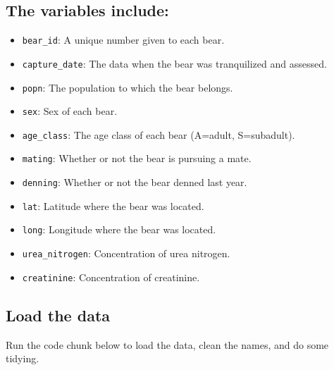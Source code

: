 \documentclass[
]{article}
\providecommand{\tightlist}{%
  \setlength{\itemsep}{0pt}\setlength{\parskip}{0pt}}
\begin{document}
\subsection{The variables include:}\label{the-variables-include}

\begin{itemize}
\tightlist
\item
  \texttt{bear\_id}: A unique number given to each bear.\\
\item
  \texttt{capture\_date}: The data when the bear was tranquilized and
  assessed.\\
\item
  \texttt{popn}: The population to which the bear belongs.\\
\item
  \texttt{sex}: Sex of each bear.\\
\item
  \texttt{age\_class}: The age class of each bear (A=adult,
  S=subadult).\\
\item
  \texttt{mating}: Whether or not the bear is pursuing a mate.\\
\item
  \texttt{denning}: Whether or not the bear denned last year.\\
\item
  \texttt{lat}: Latitude where the bear was located.\\
\item
  \texttt{long}: Longitude where the bear was located.\\
\item
  \texttt{urea\_nitrogen}: Concentration of urea nitrogen.\\
\item
  \texttt{creatinine}: Concentration of creatinine.
\end{itemize}

\subsection{Load the data}\label{load-the-data}

Run the code chunk below to load the data, clean the names, and do some
tidying.
\end{document}
